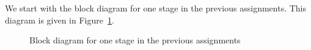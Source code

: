 
\seqfilter
We start with the block diagram for one stage in the previous assignments.
This diagram is given in Figure~\ref{fig:design:parallelstage}.

\begin{figure}[h]
	\centering
	\def\svgwidth{0.6\textwidth}
	
	\caption{Block diagram for one stage in the previous assignments}
	\label{fig:design:parallelstage}
\end{figure}

\strengthfilter
